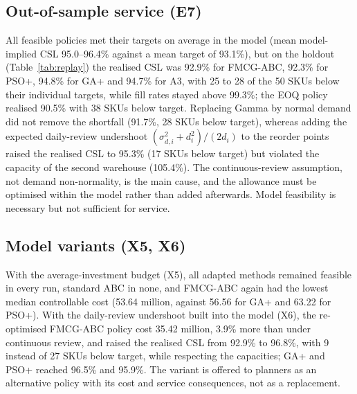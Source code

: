 \subsection{Out-of-sample service (E7)}\label{sec:replay}
All feasible policies met their targets on average in the model (mean model-implied CSL 95.0--96.4\% against a mean target of 93.1\%), but on the holdout (Table~\ref{tab:replay}) the realised CSL was 92.9\% for FMCG-ABC, 92.3\% for PSO+, 94.8\% for GA+ and 94.7\% for A3, with 25 to 28 of the 50 SKUs below their individual targets, while fill rates stayed above 99.3\%; the EOQ policy realised 90.5\% with 38 SKUs below target. Replacing Gamma by normal demand did not remove the shortfall (91.7\%, 28 SKUs below target), whereas adding the expected daily-review undershoot $(\sigma_{d,i}^2+d_i^2)/(2d_i)$ to the reorder points raised the realised CSL to 95.3\% (17 SKUs below target) but violated the capacity of the second warehouse (105.4\%). The continuous-review assumption, not demand non-normality, is the main cause, and the allowance must be optimised within the model rather than added afterwards. Model feasibility is necessary but not sufficient for service.



\subsection{Model variants (X5, X6)}\label{sec:res-variants}
With the average-investment budget (X5), all adapted methods remained feasible in every run, standard ABC in none, and FMCG-ABC again had the lowest median controllable cost (53.64 million, against 56.56 for GA+ and 63.22 for PSO+). With the daily-review undershoot built into the model (X6), the re-optimised FMCG-ABC policy cost 35.42 million, 3.9\% more than under continuous review, and raised the realised CSL from 92.9\% to 96.8\%, with 9 instead of 27 SKUs below target, while respecting the capacities; GA+ and PSO+ reached 96.5\% and 95.9\%. The variant is offered to planners as an alternative policy with its cost and service consequences, not as a replacement.
